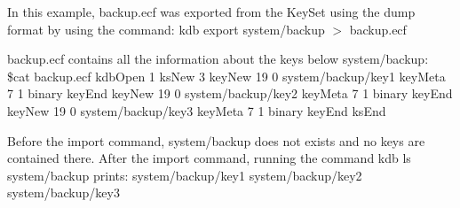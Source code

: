 In this example, backup.\+ecf was exported from the Key\+Set using the dump format by using the command\+: kdb export system/backup $>$ backup.\+ecf

backup.\+ecf contains all the information about the keys below system/backup\+: \$cat backup.\+ecf kdb\+Open 1 ks\+New 3 key\+New 19 0 system/backup/key1 key\+Meta 7 1 binary key\+End key\+New 19 0 system/backup/key2 key\+Meta 7 1 binary key\+End key\+New 19 0 system/backup/key3 key\+Meta 7 1 binary key\+End ks\+End

Before the import command, system/backup does not exists and no keys are contained there. After the import command, running the command {\ttfamily kdb ls system/backup} prints\+: system/backup/key1 system/backup/key2 system/backup/key3 